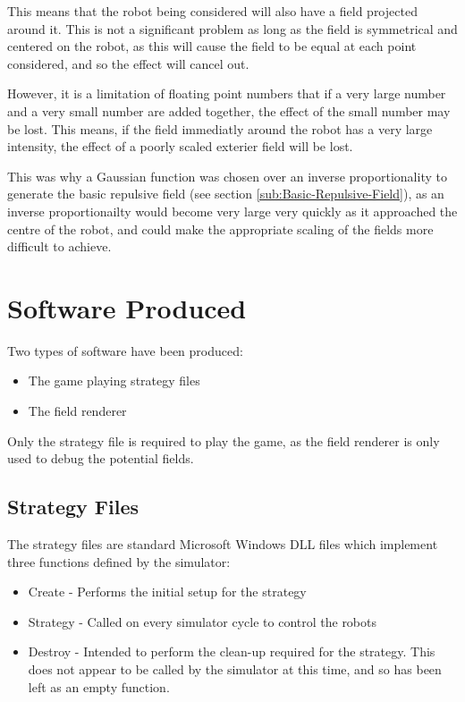 \documentclass[10pt]{article} \usepackage[a4paper]{geometry}
\begin{document}
This means that the robot being considered will also have a field projected
around it.  This is not a significant problem as long as the field is
symmetrical and centered on the robot, as this will cause the field to be equal
at each point considered, and so the effect will cancel out.

However, it is a limitation of floating point numbers that if a very large
number and a very small number are added together, the effect of the small
number may be lost.  This means, if the field immediatly around the robot has a
very large intensity, the effect of a poorly scaled exterier field will be lost.

This was why a Gaussian function was chosen over an inverse proportionality to
generate the basic repulsive field (see section
\ref{sub:Basic-Repulsive-Field}), as an inverse proportionailty would become
very large very quickly as it approached the centre of the robot, and could make
the appropriate scaling of the fields more difficult to achieve.

\section{Software Produced}

Two types of software have been produced:
\begin{itemize}
\item The game playing strategy files
\item The field renderer
\end{itemize}

Only the strategy file is required to play the game, as the field renderer is
only used to debug the potential fields.

\subsection{Strategy Files}

The strategy files are standard Microsoft Windows \ac{DLL} files which
implement three functions defined by the simulator:
\begin{itemize}
\item Create - Performs the initial setup for the strategy
\item Strategy - Called on every simulator cycle to control the robots
\item Destroy - Intended to perform the clean-up required for the strategy.
This does not appear to be called by the simulator at this time, and so has been
 left as an empty function.
\end{itemize}
\end{document}
